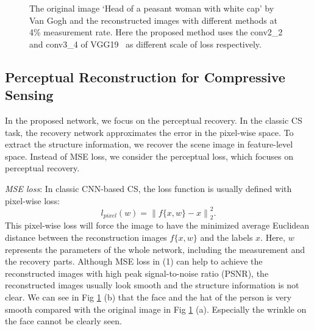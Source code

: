 \documentclass[runningheads]{llncs}
\begin{document}
\begin{figure}[!tp]
  \centering
  \caption{The original image `Head of a peasant woman with white cap' by Van Gogh and the reconstructed images with different methods at 4\% measurement rate. Here the proposed method uses the conv2\_2 and conv3\_4 of VGG19~\cite{Simonyan2014Very} as different scale of loss respectively.}
  \label{fig:vangogh}
\end{figure}

\subsection{Perceptual Reconstruction for Compressive Sensing}

In the proposed network, we focus on the perceptual recovery.
In the classic CS task, the recovery network approximates the error in the pixel-wise space.
To extract the structure information, we recover the scene image in feature-level space.
Instead of MSE loss, we consider the perceptual loss, which focuses on perceptual recovery.

\emph{MSE loss}: In classic CNN-based CS, the loss function is usually defined with pixel-wise loss:
\begin{equation}
  l_{pixel}(w)=\left \| f\{x,w\}-x \right \|_2^2.
\end{equation}
This pixel-wise loss will force the image to have the minimized average Euclidean distance between the reconstruction images $f\{x,w\}$ and the labels $x$.
Here, $w$ represents the parameters of the whole network, including the measurement and the recovery parts.
Although MSE loss in (1) can help to achieve the reconstructed images with high peak signal-to-noise ratio (PSNR), the reconstructed images usually look smooth and the structure information is not clear.
We can see in Fig \ref{fig:vangogh} (b) that the face and the hat of the person is very smooth compared with the original image in Fig \ref{fig:vangogh} (a). Especially the wrinkle on the face cannot be clearly seen.
\end{document}
